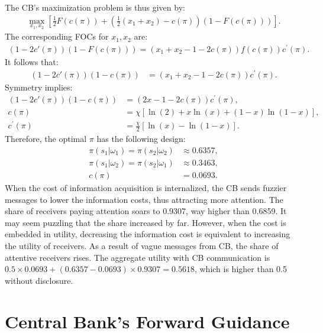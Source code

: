 \documentclass[12pt,a4paper]{article}
\begin{document}
The CB's maximization problem is thus given by:
\begin{align}
    \max_{x_1,x_2} \left[\frac{1}{2}F(c(\pi)) + \left(\frac{1}{2}(x_1+x_2)-c(\pi)\right)(1-F(c(\pi)))\right].
\end{align}
The corresponding FOCs for $x_1,x_2$ are:
\begin{align}
    (1-2c'(\pi))(1-F(c(\pi)))=(x_1+x_2-1-2c(\pi))f(c(\pi))c^\prime(\pi).
\end{align}
It follows that:
\begin{align}
    (1-2c'(\pi))(1-c(\pi)) & = (x_1+x_2-1-2c(\pi))c^\prime(\pi).
\end{align}
Symmetry implies:
\begin{align}
    (1-2c'(\pi))(1-c(\pi)) & = (2x-1-2c(\pi))c^\prime(\pi), \\
    c(\pi) & = \chi[\ln(2)+x\ln(x)+(1-x)\ln(1-x)], \\
    c^\prime(\pi) & = \frac{\chi}{2}[\ln(x)-\ln(1-x)].
\end{align}
Therefore, the optimal $\pi$ has the following design:
\begin{align}
    \pi(s_1|\omega_1) = \pi(s_2|\omega_2) & \approx 0.6357, \\
    \pi(s_1|\omega_2) = \pi(s_2|\omega_1) & \approx 0.3463, \\
    c(\pi) & = 0.0693.
\end{align}
When the cost of information acquisition is internalized, the CB sends fuzzier messages to lower the information costs, thus attracting more attention. The share of receivers paying attention soars to 0.9307, way higher than 0.6859. It may seem puzzling that the share increased by far. However, when the cost is embedded in utility, decreasing the information cost is equivalent to increasing the utility of receivers. As a result of vague messages from CB, the share of attentive receivers rises. The aggregate utility with CB communication is $0.5 \times 0.0693 + (0.6357-0.0693) \times  0.9307 = 0.5618$, which is higher than 0.5 without disclosure. 

\section{Central Bank's Forward Guidance}
\end{document}
